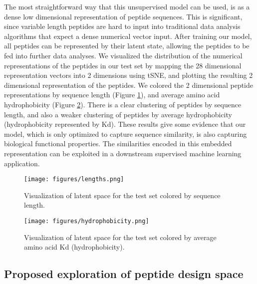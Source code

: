 \documentclass[final,1p,times]{elsarticle}
\begin{document}
The most straightforward way that this unsupervised model can be used, is as a dense low dimensional representation of peptide sequences. This is significant, since variable length peptides are hard to input into traditional data analysis algorithms that expect a dense numerical vector input. After training our model, all peptides can be represented by their latent state, allowing the peptides to be fed into further data analyses. We visualized the distribution of the numerical representations of the peptides in our test set by mapping the 28 dimensional representation vectors into 2 dimensions using tSNE, and plotting the resulting 2 dimensional representation of the peptides. We colored the 2 dimensional peptide representations by sequence length (Figure \ref{lengths}), and average amino acid hydrophobicity (Figure \ref{hydrophobicity}). There is a clear clustering of peptides by sequence length, and also a weaker clustering of peptides by average hydrophobicity (hydrophobicity represented by Kd). These results give some evidence that our model, which is only optimized to capture sequence similarity, is also capturing biological functional properties. The similarities encoded in this embedded representation can be exploited in a downstream supervised machine learning application.

\begin{figure}[h]
  \centering
  \texttt{[image: figures/lengths.png]}
  \caption{Visualization of latent space for the test set colored by sequence length.}
  \label{lengths}
\end{figure}

\begin{figure}[h]
  \centering
  \texttt{[image: figures/hydrophobicity.png]}
  \caption{Visualization of latent space for the test set colored by average amino acid Kd (hydrophobicity).}
  \label{hydrophobicity}
\end{figure}


\subsection{Proposed exploration of peptide design space}
\end{document}
